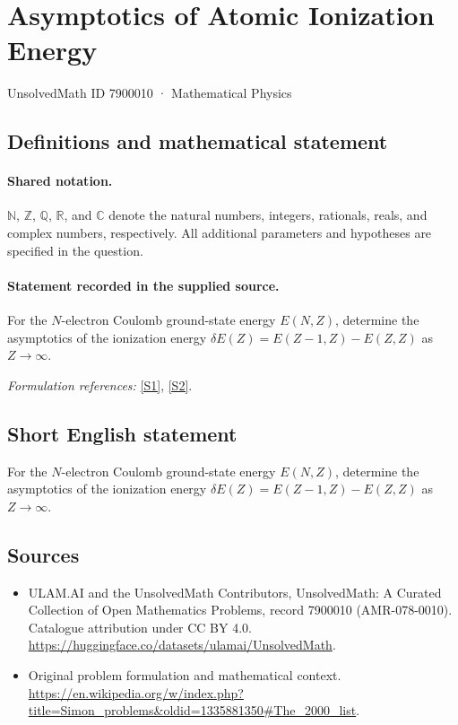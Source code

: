 \documentclass[11pt]{article}
\newcommand{\sref}[2]{\hyperlink{source:#1:#2}{[S#2]}}
\begin{document}
\setcounter{section}{7900009}
\section{Asymptotics of Atomic Ionization Energy}\label{7900010}
{\small UnsolvedMath ID 7900010 · Mathematical Physics}
\subsection{Definitions and mathematical statement}

\paragraph{Shared notation.}$\mathbb N$, $\mathbb Z$, $\mathbb Q$, $\mathbb R$, and $\mathbb C$ denote the natural numbers, integers, rationals, reals, and complex numbers, respectively. All additional parameters and hypotheses are specified in the question.


\paragraph{Statement recorded in the supplied source.}
For the $N$-electron Coulomb ground-state energy $E(N,Z)$, determine the asymptotics of the ionization energy $\delta E(Z)=E(Z-1,Z)-E(Z,Z)$ as $Z\to\infty$.
\par\smallskip\textit{Formulation references:} \sref{7900010}{1}, \sref{7900010}{2}.
\subsection{Short English statement}
For the $N$-electron Coulomb ground-state energy $E(N,Z)$, determine the asymptotics of the ionization energy $\delta E(Z)=E(Z-1,Z)-E(Z,Z)$ as $Z\to\infty$.
\subsection{Sources}
\begin{itemize}
\item[\hypertarget{source:7900010:1}{S1}] ULAM.AI and the UnsolvedMath Contributors, UnsolvedMath: A Curated Collection of Open Mathematics Problems, record 7900010 (AMR-078-0010). Catalogue attribution under CC BY 4.0.
\url{https://huggingface.co/datasets/ulamai/UnsolvedMath}.
\item[\hypertarget{source:7900010:2}{S2}] Original problem formulation and mathematical context.
\url{https://en.wikipedia.org/w/index.php?title=Simon_problems&oldid=1335881350#The_2000_list}.
\end{itemize}
\label{end:7900010}
\end{document}
